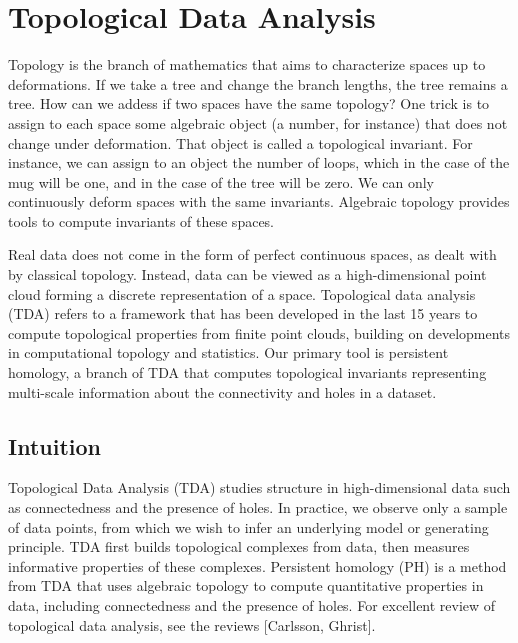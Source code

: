 
\section{Topological Data Analysis}
\label{background:sec:tda}

Topology is the branch of mathematics that aims to characterize spaces up to deformations.
If we take a tree and change the branch lengths, the tree remains a tree.
How can we addess if two spaces have the same topology?
One trick is to assign to each space some algebraic object (a number, for instance) that does not change under deformation.
That object is called a topological invariant.
For instance, we can assign to an object the number of loops, which in the case of the mug will be one, and in the case of the tree will be zero.
We can only continuously deform spaces with the same invariants.
Algebraic topology provides tools to compute invariants of these spaces.

Real data does not come in the form of perfect continuous spaces, as dealt with by classical topology.
Instead, data can be viewed as a high-dimensional point cloud forming a discrete representation of a space.
Topological data analysis (TDA) refers to a framework that has been developed in the last 15 years to compute topological properties from finite point clouds, building on developments in computational topology and statistics.
Our primary tool is persistent homology, a branch of TDA that computes topological invariants representing multi-scale information about the connectivity and holes in a dataset.

\subsection{Intuition}

Topological Data Analysis (TDA) studies structure in high-dimensional data such as connectedness and the presence of holes.
In practice, we observe only a sample of data points, from which we wish to infer an underlying model or generating principle.
TDA first builds topological complexes from data, then measures informative properties of these complexes. 
Persistent homology (PH) is a method from TDA that uses algebraic topology to compute quantitative properties in data, including connectedness and the presence of holes.
For excellent review of topological data analysis, see the reviews [Carlsson, Ghrist].

